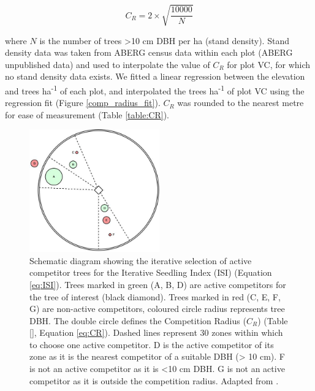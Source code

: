 \documentclass[a4paper, 11pt]{article}
\begin{document}
\begin{equation}
\label{eq:CR}
C_R = 2 \times \sqrt{\frac{10000}{N}}
\end{equation}

where $N$ is the number of trees \textgreater10 cm DBH per ha (stand density). Stand density data was taken from ABERG census data within each plot (ABERG unpublished data) and used to interpolate the value of $C_R$ for plot VC, for which no stand density data exists. We fitted a linear regression between the elevation and trees ha\textsuperscript{-1} of each plot, and interpolated the trees ha\textsuperscript{-1} of plot VC using the regression fit (Figure \ref{comp_radius_fit}). $C_R$ was rounded to the nearest metre for ease of measurement (Table \ref{table:CR}). 

\begin{figure}[H]
\includegraphics[width=0.5\textwidth]{hegyi}
\centering
\caption{Schematic diagram showing the iterative selection of active competitor trees for the Iterative Seedling Index (ISI) (Equation \ref{eq:ISI}). Trees marked in green (A, B, D) are active competitors for the tree of interest (black diamond). Trees marked in red (C, E, F, G) are non-active competitors, coloured circle radius represents tree DBH. The double circle defines the Competition Radius ($C_R$) (Table \ref{}, Equation \ref{eq:CR}). Dashed lines represent 30\textdegree{} zones within which to choose one active competitor. D is the active competitor of its zone as it is the nearest competitor of a suitable DBH (\textgreater{} 10 cm). F is not an active competitor as it is \textless{}10 cm DBH. G is not an active competitor as it is outside the competition radius. Adapted from \citet{Lee2004}.}
\label{hegyi}
\end{figure}
\end{document}
